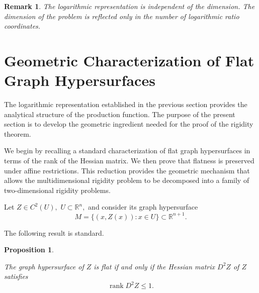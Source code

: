 \documentclass[12pt]{amsart}
\newtheorem{proposition}{Proposition}[section]
\newtheorem{remark}{Remark}[section]
\begin{document}
\begin{remark}

The logarithmic representation is independent of the dimension.
The dimension of the problem is reflected only in the number of
logarithmic ratio coordinates.


\end{remark}







\section{Geometric Characterization of Flat Graph Hypersurfaces}\label{S4}

The logarithmic representation established in the previous section
provides the analytical structure of the production function.
The purpose of the present section is to develop the geometric
ingredient needed for the proof of the rigidity theorem.

We begin by recalling a standard characterization of flat graph hypersurfaces in terms of the rank of the Hessian matrix. We then prove that flatness is preserved under affine restrictions. This reduction provides the geometric mechanism that allows the multidimensional rigidity problem to be decomposed into a family of two-dimensional rigidity problems.

Let
\(
Z\in C^{2}(U),
\)
\(U\subset\mathbb R^{n},
\)
and consider its graph hypersurface
\[
M
=
\{
(x,Z(x))
:
x\in U
\}
\subset\mathbb R^{n+1}.
\]

The following result is standard.

\begin{proposition}
\label{prop:flatness}

The graph hypersurface of \(Z\) is flat if and only if the Hessian matrix $D^{2}Z$ of \(Z\) satisfies
\[
\operatorname{rank}D^{2}Z\le1.
\]

\end{proposition}
\end{document}
